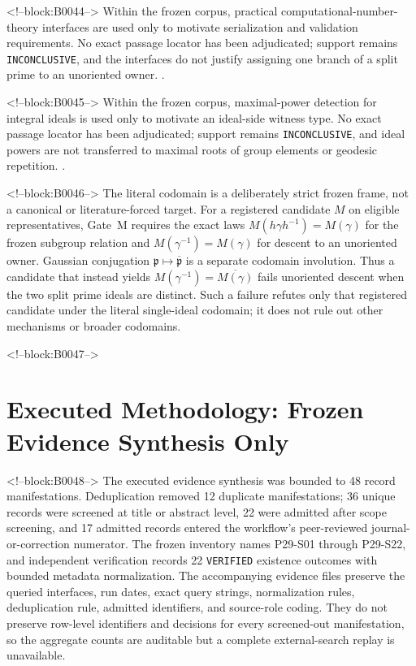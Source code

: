 \documentclass[11pt,a4paper]{article}
\begin{document}
<!--block:B0044-->
Within the frozen corpus, practical computational-number-theory interfaces are used only to motivate serialization and validation requirements. No exact passage locator has been adjudicated; support remains \texttt{INCONCLUSIVE}, and the interfaces do not justify assigning one branch of a split prime to an unoriented owner.
\citep{P29-S21}.

<!--block:B0045-->
Within the frozen corpus, maximal-power detection for integral ideals is used only to motivate an ideal-side witness type. No exact passage locator has been adjudicated; support remains \texttt{INCONCLUSIVE}, and ideal powers are not transferred to maximal roots of group elements or geodesic repetition.
\citep{P29-S22}.

<!--block:B0046-->
The literal codomain is a deliberately strict frozen frame, not a canonical or literature-forced target. For a registered candidate \(M\) on eligible representatives, Gate~M requires the exact laws \(M(h\gamma h^{-1})=M(\gamma)\) for the frozen subgroup relation and \(M(\gamma^{-1})=M(\gamma)\) for descent to an unoriented owner. Gaussian conjugation \(\mathfrak p\mapsto\overline{\mathfrak p}\) is a separate codomain involution. Thus a candidate that instead yields \(M(\gamma^{-1})=\overline{M(\gamma)}\) fails unoriented descent when the two split prime ideals are distinct. Such a failure refutes only that registered candidate under the literal single-ideal codomain; it does not rule out other mechanisms or broader codomains.

<!--block:B0047-->
\section{Executed Methodology: Frozen Evidence Synthesis Only}

<!--block:B0048-->
The executed evidence synthesis was bounded to 48 record manifestations. Deduplication removed 12 duplicate manifestations; 36 unique records were screened at title or abstract level, 22 were admitted after scope screening, and 17 admitted records entered the workflow's peer-reviewed journal-or-correction numerator. The frozen inventory names P29-S01 through P29-S22, and independent verification records 22 \texttt{VERIFIED} existence outcomes with bounded metadata normalization. The accompanying evidence files preserve the queried interfaces, run dates, exact query strings, normalization rules, deduplication rule, admitted identifiers, and source-role coding. They do not preserve row-level identifiers and decisions for every screened-out manifestation, so the aggregate counts are auditable but a complete external-search replay is unavailable.
\end{document}
